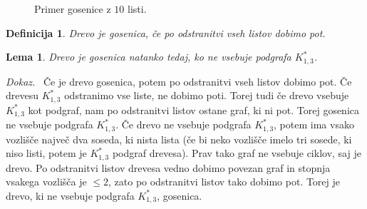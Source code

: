 \documentclass[a4paper, 12pt]{book}
\newtheorem{definicija}{Definicija}[chapter]
\newtheorem{lema}{Lema}[chapter]
\newenvironment{dokaz}{\emph{Dokaz.}\ }{\hspace{\fill}{$\Box$}}
\begin{document}
\begin{figure}[h]
    \begin{center}        
    \end{center}
    \caption{Primer gosenice z $10$ listi.}
    \label{graf_gosenice_10_listov}
\end{figure}

\begin{definicija}
    Drevo je gosenica, če po odstranitvi vseh listov dobimo pot.
\end{definicija}


\begin{lema}
\label{lema_gosenica_ne_vsebuje_k13}
    Drevo je gosenica natanko tedaj, ko ne vsebuje podgrafa $K_{1,3}^*$.
\end{lema}
\begin{dokaz}
    Če je drevo gosenica, potem po odstranitvi vseh listov dobimo pot. Če drevesu $K_{1,3}^*$ odstranimo vse liste, ne dobimo poti. Torej tudi če drevo vsebuje $K_{1,3}^*$ kot podgraf, nam po odstranitvi listov ostane graf, ki ni pot. Torej gosenica ne vsebuje podgrafa $K_{1,3}^*$. Če drevo ne vsebuje podgrafa $K_{1,3}^*$, potem ima vsako vozlišče največ dva soseda, ki nista lista (če bi neko vozlišče imelo tri sosede, ki niso listi, potem je $K_{1,3}^*$ podgraf drevesa). Prav tako graf ne vsebuje ciklov, saj je drevo. Po odstranitvi listov drevesa vedno dobimo povezan graf in stopnja vsakega vozlišča je $\leq 2$, zato po odstranitvi listov tako dobimo pot. Torej je drevo, ki ne vsebuje podgrafa $K_{1,3}^*$, gosenica.
\end{dokaz}
\end{document}
